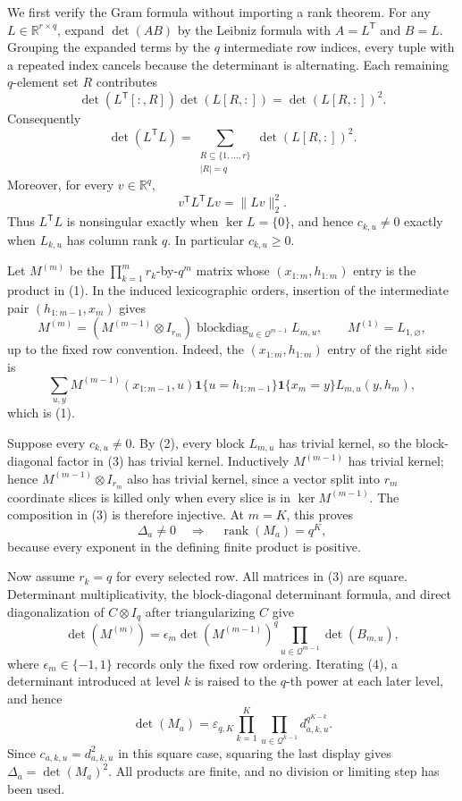 We first verify the Gram formula without importing a rank theorem.  For any \(L\in\mathbb R^{r\times q}\), expand \(\det(AB)\) by the Leibniz formula with \(A=L^{\mathsf T}\) and \(B=L\).  Grouping the expanded terms by the \(q\) intermediate row indices, every tuple with a repeated index cancels because the determinant is alternating.  Each remaining \(q\)-element set \(R\) contributes
\[
 \det(L^{\mathsf T}[:,R])\det(L[R,:])
 =\det(L[R,:])^2.
\]
Consequently
\[
 \det(L^{\mathsf T}L)=
 \sum_{\substack{R\subseteq\{1,\ldots,r\}\\|R|=q}}
 \det(L[R,:])^2.
\tag{2}
\]
Moreover, for every \(v\in\mathbb R^q\),
\[
 v^{\mathsf T}L^{\mathsf T}Lv=\|Lv\|_2^2.
\]
Thus \(L^{\mathsf T}L\) is nonsingular exactly when \(\ker L=\{0\}\), and hence \(c_{k,u}\neq0\) exactly when \(L_{k,u}\) has column rank \(q\).  In particular \(c_{k,u}\ge0\).

Let \(M^{(m)}\) be the \(\prod_{k=1}^mr_k\)-by-\(q^m\) matrix whose \((x_{1:m},h_{1:m})\) entry is the product in (1).  In the induced lexicographic orders, insertion of the intermediate pair \((h_{1:m-1},x_m)\) gives
\[
 M^{(m)}=(M^{(m-1)}\otimes I_{r_m})
 \operatorname{blockdiag}_{u\in\mathcal Q^{m-1}}L_{m,u},
 \qquad M^{(1)}=L_{1,\varnothing},
\tag{3}
\]
up to the fixed row convention.  Indeed, the \((x_{1:m},h_{1:m})\) entry of the right side is
\[
 \sum_{u,y}M^{(m-1)}(x_{1:m-1},u)
 \mathbf1\{u=h_{1:m-1}\}\mathbf1\{x_m=y\}
 L_{m,u}(y,h_m),
\]
which is (1).

Suppose every \(c_{k,u}\neq0\).  By (2), every block \(L_{m,u}\) has trivial kernel, so the block-diagonal factor in (3) has trivial kernel.  Inductively \(M^{(m-1)}\) has trivial kernel; hence \(M^{(m-1)}\otimes I_{r_m}\) also has trivial kernel, since a vector split into \(r_m\) coordinate slices is killed only when every slice is in \(\ker M^{(m-1)}\).  The composition in (3) is therefore injective.  At \(m=K\), this proves
\[
 \Delta_a\neq0
 \quad\Longrightarrow\quad
 \operatorname{rank}(M_a)=q^K,
\]
because every exponent in the defining finite product is positive.

Now assume \(r_k=q\) for every selected row.  All matrices in (3) are square.  Determinant multiplicativity, the block-diagonal determinant formula, and direct diagonalization of \(C\otimes I_q\) after triangularizing \(C\) give
\[
 \det(M^{(m)})=\epsilon_m\det(M^{(m-1)})^q
 \prod_{u\in\mathcal Q^{m-1}}\det(B_{m,u}),
\tag{4}
\]
where \(\epsilon_m\in\{-1,1\}\) records only the fixed row ordering.  Iterating (4), a determinant introduced at level \(k\) is raised to the \(q\)-th power at each later level, and hence
\[
 \det(M_a)=\varepsilon_{q,K}
 \prod_{k=1}^K\prod_{u\in\mathcal Q^{k-1}}
 d_{a,k,u}^{q^{K-k}}.
\]
Since \(c_{a,k,u}=d_{a,k,u}^2\) in this square case, squaring the last display gives \(\Delta_a=\det(M_a)^2\).  All products are finite, and no division or limiting step has been used.


